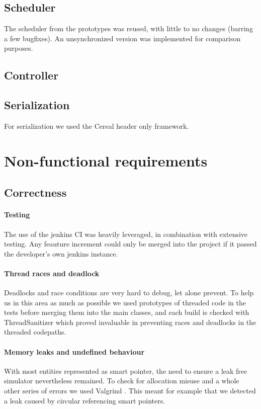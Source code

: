 \documentclass[8pt,a4paper]{report}
\begin{document}
\section{Scheduler}
The scheduler from the prototypes was reused, with little to no changes (barring a few bugfixes). An unsynchronized version was implemented for comparison purposes.

\section{Controller}

\section{Serialization}
For serialization we used the Cereal \cite{cereal} header only framework.

\chapter{Non-functional requirements}
\section{Correctness}
\subsubsection{Testing}
The use of the jenkins CI was heavily leveraged, in combination with extensive testing. Any feauture increment could only be merged into the project if it passed the developer's own jenkins instance.
\subsubsection{Thread races and deadlock}
Deadlocks and race conditions are very hard to debug, let alone prevent. To help us in this area as much as possible we used prototypes of threaded code in the tests before merging them into the main classes, and each build is checked with ThreadSanitizer \cite{tsan} which proved invaluable in preventing races and deadlocks in the threaded codepaths.
\subsubsection{Memory leaks and undefined behaviour}
With most entities represented as smart pointer, the need to ensure a leak free simulator nevertheless remained. To check for allocation misuse and a whole other series of errors we used Valgrind \cite{vg}. This meant for example that we detected a leak caused by circular referencing smart pointers.
\end{document}
